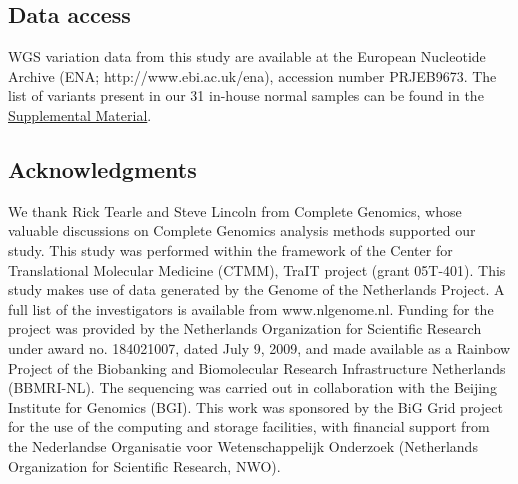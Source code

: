 \subsection*{Data access}

WGS variation data from this study are available at the European Nucleotide Archive (ENA; http://www.ebi.ac.uk/ena), accession number PRJEB9673. The list of variants present in our 31 in-house normal samples can be found in the \href{https://genome.cshlp.org/content/25/9/1382/suppl/DC1}{Supplemental Material}.

\subsection*{Acknowledgments}

We thank Rick Tearle and Steve Lincoln from Complete Genomics, whose valuable discussions on Complete Genomics analysis methods supported our study. This study was performed within the framework of the Center for Translational Molecular Medicine (CTMM), TraIT project (grant 05T-401). This study makes use of data generated by the Genome of the Netherlands Project. A full list of the investigators is available from www.nlgenome.nl. Funding for the project was provided by the Netherlands Organization for Scientific Research under award no. 184021007, dated July 9, 2009, and made available as a Rainbow Project of the Biobanking and Biomolecular Research Infrastructure Netherlands (BBMRI-NL). The sequencing was carried out in collaboration with the Beijing Institute for Genomics (BGI). This work was sponsored by the BiG Grid project for the use of the computing and storage facilities, with financial support from the Nederlandse Organisatie voor Wetenschappelijk Onderzoek (Netherlands Organization for Scientific Research, NWO).

\footnotesize


\normalsize
